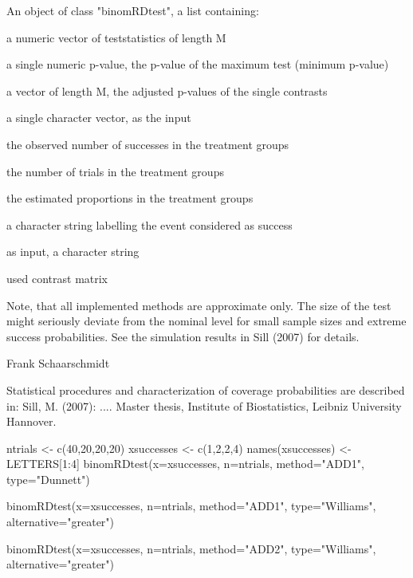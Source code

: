 \begin{Value}
An object of class "binomRDtest", a list containing:
\begin{ldescription}
\item[\code{teststat}] a numeric vector of teststatistics of length M
\item[\code{pval}] a single numeric p-value, the p-value of the maximum test (minimum p-value)
\item[\code{p.val.adj}] a vector of length M, the adjusted p-values of the single contrasts
\item[\code{alternative}] a single character vector, as the input
\item[\code{x}] the observed number of successes in the treatment groups
\item[\code{n}] the number of trials in the treatment groups
\item[\code{p}] the estimated proportions in the treatment groups
\item[\code{success}] a character string labelling the event considered as success
\item[\code{method}] as input, a character string
\item[\code{cmat}] used contrast matrix
\end{ldescription}
\end{Value}
\begin{Note}\relax
Note, that all implemented methods are approximate only. The size of the 
test might seriously deviate from the nominal level for small sample sizes and extreme success probabilities.
See the simulation results in Sill (2007) for details.
\end{Note}
\begin{Author}\relax
Frank Schaarschmidt
\end{Author}
\begin{References}\relax
Statistical procedures and characterization of coverage probabilities are described in:
Sill, M. (2007):
....
Master thesis, Institute of Biostatistics, Leibniz University Hannover.
\end{References}
\begin{SeeAlso}\relax
{}
\end{SeeAlso}
\begin{Examples}
\begin{ExampleCode}

ntrials <- c(40,20,20,20)
xsuccesses <- c(1,2,2,4)
names(xsuccesses) <- LETTERS[1:4]
binomRDtest(x=xsuccesses, n=ntrials, method="ADD1", type="Dunnett")

binomRDtest(x=xsuccesses, n=ntrials, method="ADD1", type="Williams", alternative="greater")

binomRDtest(x=xsuccesses, n=ntrials, method="ADD2", type="Williams", alternative="greater")
\end{ExampleCode}
\end{Examples}

